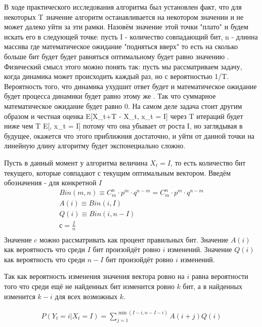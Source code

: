 \documentclass[times,specification,annotation]{itmo-student-thesis}
\begin{document}
    В ходе практического исследования алгоритма был установлен факт, что для некоторых T значение алгоритм останавливается на некотором значении и не может далеко уйти за эти рамки.
    Назовём значение этой точки "плато" и будем искать его в следующей точке: пусть I - количество совпадающий бит, n - длинна массива где математическое ожидание "подняться вверх" то есть на сколько больше бит будет будет равняться оптимальному будет равно значению .
    Физический смысл этого можно понять так: пусть мы рассматриваем задачу, когда динамика может происходить каждый раз, но с вероятностью 1/T.
    Вероятность того, что динамика ухудшит ответ будет  и математическое ожидание будет процесса динамики будет равно этому же .
    Так что суммарное математическое ожидание будет равно 0.
    На самом деле задача стоит другим образом и честная оценка E[X_{t+T} - X_t, x_t = I] через T итераций будет ниже чем T \cdot E[\deltaX, x_t = I] потому что она убывает от роста I, но заглядывая в будущее, окажется что этого приближния достаточно, и уйти от данной точки на линейную длину алгоритму будет экспонециально сложно.

    Пусть в данный момент у алгоритма величина $X_t = I$, то есть количество бит текущего, которые совпадают с текущим оптимальным вектором.
    Введём обозначения - для конкретной $I$
    \begin{gather*}
        Bin(m, n) \equiv C_m^n \cdot p^{m} \cdot q^{n - m} = C_m^n \cdot p^{m} \cdot q^{n - m}\\
        A(i) \equiv Bin(i, I)\\
        Q(i) \equiv Bin(i, n - I)\\
        с = \frac{I}{n}\\
    \end{gather*}
    Значение $c$ можно рассматривать как процент правильных бит.
    Значение $A(i)$ как вероятность что среди $I$ бит произойдёт ровно $i$ изменений.
    Значение $Q(i)$ как вероятность что среди $n - I$ бит произойдёт ровно $i$ изменений.

    Так как вероятность изменения значения вектора ровно на $i$ равна вероятности того что среди ещё не найденных бит изменится ровно $k$ бит, а в найденных изменится $k - i$ для всех возможных $k$.

    \begin{gather*}
        P(Y_t = i|X_t=I) = \sum_{j=1}^{\min(I - i, n - I - i)} A(i + j)Q(i)
    \end{gather*}
\end{document}
